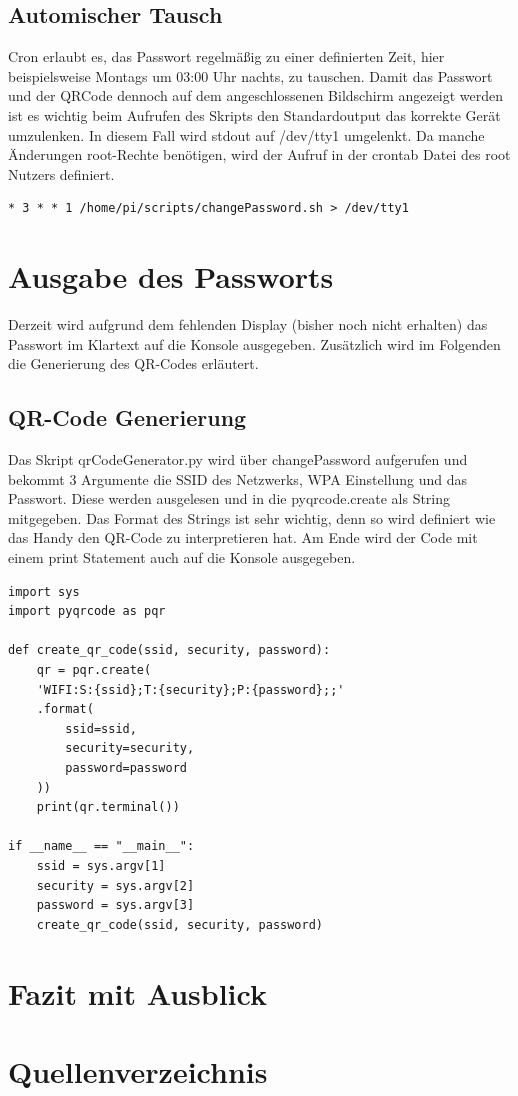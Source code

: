 \documentclass[a4paper,11pt,singlespacing]{article}
\begin{document}
    		\subsection{Automischer Tausch}
    			Cron erlaubt es, das Passwort regelmäßig zu einer definierten Zeit, hier beispielsweise Montags um 03:00 Uhr nachts, zu tauschen. Damit das Passwort und der QRCode dennoch auf dem angeschlossenen Bildschirm angezeigt werden ist es wichtig beim Aufrufen des Skripts den Standardoutput das korrekte Gerät umzulenken. In diesem Fall wird stdout auf /dev/tty1 umgelenkt. Da manche Änderungen root-Rechte benötigen, wird der Aufruf in der crontab Datei des root Nutzers definiert.
    			\begin{lstlisting}
* 3 * * 1 /home/pi/scripts/changePassword.sh > /dev/tty1
    			\end{lstlisting}
    		
    		    	
    	\section{Ausgabe des Passworts}
    		Derzeit wird aufgrund dem fehlenden Display (bisher noch nicht erhalten)  das Passwort im Klartext auf die Konsole ausgegeben. Zusätzlich wird im Folgenden die Generierung des QR-Codes erläutert.
    		
    		\subsection{QR-Code Generierung}
			Das Skript qrCodeGenerator.py wird über changePassword aufgerufen und bekommt 3 Argumente die SSID des Netzwerks, WPA Einstellung und das Passwort. Diese werden ausgelesen und in die pyqrcode.create als String mitgegeben. Das Format des Strings ist sehr wichtig, denn so wird definiert wie das Handy den QR-Code zu interpretieren hat. Am Ende wird der Code mit einem print Statement auch auf die Konsole ausgegeben. \\ 
    	
    	\lstset{
    		basicstyle=\ttfamily,
    		language=Python,
    	}
    	

            \begin{lstlisting}
import sys
import pyqrcode as pqr

def create_qr_code(ssid, security, password):
	qr = pqr.create(
	'WIFI:S:{ssid};T:{security};P:{password};;'
	.format(
		ssid=ssid,
		security=security,
		password=password
	))
	print(qr.terminal())

if __name__ == "__main__":
	ssid = sys.argv[1]
	security = sys.argv[2]
	password = sys.argv[3]
	create_qr_code(ssid, security, password)
	 \end{lstlisting}
    	\section{Fazit mit Ausblick}
    	
    	\section{Quellenverzeichnis}
        
        
    	
\end{document}
